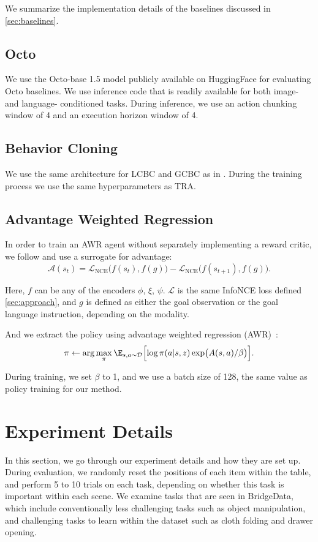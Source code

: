 We summarize the implementation details of the baselines discussed in \cref{sec:baselines}.

\subsection{Octo}
We use the Octo-base 1.5 model publicly available on HuggingFace for evaluating Octo baselines.
We use inference code that is readily available for both image- and language- conditioned tasks.
During inference, we use an action chunking window of 4 and an execution horizon window of 4.
\subsection{Behavior Cloning}
We use the same architecture for LCBC and GCBC as in \citet{walke2023bridgedata,myers2023goal}.
During the training process we use the same hyperparameters as TRA.

\subsection{Advantage Weighted Regression}
In order to train an AWR agent without separately implementing a reward critic, we follow \citet{eysenbach2022contrastive} and use a surrogate for advantage:
\begin{equation}
    \mathcal{A}(s_t) = \mathcal{L}_{\text{NCE}}\bigl(f(s_t), f(g)\bigr) - \mathcal{L}_{\text{NCE}}\bigl(f(s_{t+1}), f(g)\bigr).
\end{equation}

Here, $f$ can be any of the encoders $\phi$, $\xi$, $\psi$. $\mathcal{L}$ is the same InfoNCE loss defined \cref{sec:approach}, and $g$ is defined as either the goal observation or the goal language instruction, depending on the modality.

And we extract the policy using advantage weighted regression (AWR)~\citep{neumann2008fitted}:
\begin{equation}
    \pi \leftarrow \arg \max_\pi \E_{s, a \sim \mathcal{D}} \Bigl[\log \pi(a|s, z) \exp\bigl(A(s,a) / \beta\bigr)\Bigr].
    \label{eq:awr}
\end{equation}

During training, we set $\beta$ to 1, and we use a batch size of 128, the same value as policy training for our method.

\section{Experiment Details}\label{sec:experiment_details}
In this section, we go through our experiment details and how they are set up.
During evaluation, we randomly reset the positions of each item within the table, and perform 5 to 10 trials on each task, depending on whether this task is important within each scene.
We examine tasks that are seen in BridgeData, which include conventionally less challenging tasks such as object manipulation, and challenging tasks to learn within the dataset such as cloth folding and drawer opening.

